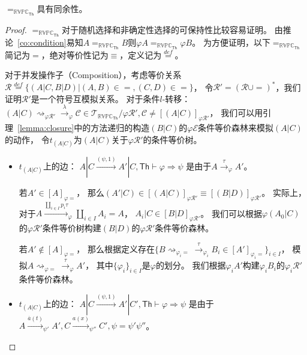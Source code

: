 \begin{theorem}
   $=_{\mathbb{RVPC}_{\mathsf{Th}}}$具有同余性。
\end{theorem}
\begin{proof}
   $=_{\mathbb{RVPC}_{\mathsf{Th}}}$对于随机选择和非确定性选择的可保持性比较容易证明。
   由推论~\ref{co:condition}易知$A=_{\mathbb{RVPC}_{\mathsf{Th}}}B$则$\varphi A=_{\mathbb{RVPC}_{\mathsf{Th}}}\varphi B$。
   为方便证明，以下$=_{\mathbb{RVPC}_{\mathsf{Th}}}$简记为$=$，绝对等价性记为$\equiv$，定义记为$\stackrel{def}{=}$。

   对于并发操作子（Composition），考虑等价关系$\mathcal{R}\stackrel{def}{=}\{(A|C,B|D)|(A,B)\in =,(C,D)\in =\}$，
   令$\mathcal{R}' = (\mathcal{R}\cup =)^*$，我们证明$\mathcal{R}'$是一个符号互模拟关系。
   对于条件$l$-转移：$(A|C)\rightsquigarrow_{\varphi\mathcal{R'}}\stackrel{\lambda}{\rightarrow}_{\varphi}\mathcal{C}\in\mathcal{T}_{\mathbb{RVPC}_{\mathsf{Th}}}/\varphi \mathcal{R}',\mathcal{C}\neq [(A|C)]_{\varphi\mathcal{R}'}$，
   我们可以用引理~\ref{lemma:closure}中的方法递归的构造$(B|C)$的$\varphi\mathcal{E}$条件等价森林来模拟$(A|C)$的动作，
   令$t_{(A|C)}$为$(A|C)$关于$\varphi\mathcal{R'}$的条件等价树。
   \begin{itemize}
      \item {
         $t_{(A|C)}$上的边：
         $A|C\stackrel{(\psi, 1)}{\rightarrow} A'|C, \mathsf{Th}\vdash \varphi\Rightarrow\psi$
         是由于$A\stackrel{\tau}{\rightarrow}_{\varphi} A'$。

         若$A'\in [A]_{\varphi =}$，
         那么$(A'|C)\in[(A|C)]_{\varphi\mathcal{R}'}\equiv[(B|D)]_{\varphi\mathcal{R}'}$。
         实际上，对于$A\stackrel{\coprod_{i\in I}p_i\tau}{\rightarrow}_{\varphi} \coprod_{i\in I} A_i=A$，
         $A_i|C\in [B|D]_{\varphi\mathcal{R}'}$。
         我们可以根据$\varphi (A_0|C)$的$\varphi\mathcal{R}'$条件等价树构建$(B|D)$的$\varphi\mathcal{R}'$条件等价森林。

         若$A'\notin [A]_{\varphi =}$，
         那么根据定义存在$\{B\rightsquigarrow_{\varphi_i\mathcal{=}}\stackrel{\tau}{\rightarrow}_{\varphi_i}B_i\in [A']_{\varphi_i =}\}_{i\in I}$，
         模拟$A\rightsquigarrow_{\varphi =}\stackrel{\tau}{\rightarrow}_{\varphi} A'$，
         其中$\{\varphi_i\}_{i\in I}$是$\varphi$的划分。
         我们根据$\varphi_i A'$构建$\varphi_i B_i$的$\varphi_i \mathcal{R}'$条件等价森林。
      }
      \item {
         $t_{(A|C)}$上的边：
         $A|C\stackrel{(\psi, 1)}{\rightarrow} A'|C', \mathsf{Th}\vdash \varphi\Rightarrow\psi$
         是由于$A\stackrel{\overline{a}(t)}{\longrightarrow}_{\psi'} A', C\stackrel{a(x)}{\longrightarrow}_{\psi''} C', \psi=\psi'\psi''$。

}
\end{itemize}
\end{proof}
